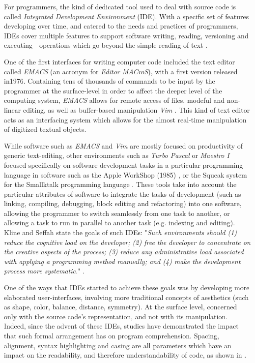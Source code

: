 For programmers, the kind of dedicated tool used to deal with source code is called \emph{Integrated Development Environment} (IDE). With a specific set of features developing over time, and catered to the needs and practices of programmers, IDEs cover multiple features to support software writing, reading, versioning and executing—operations which go beyond the simple reading of text \citep{kline_evaluation_2005}.

One of the first interfaces for writing computer code included the text editor called \emph{EMACS} (an acronym for \emph{Editor MACroS}), with a first version released in1976. Containing tens of thousands of commands to be input by the programmer at the surface-level in order to affect the deeper level of the computing system, \emph{EMACS} allows for remote access of files, modeful and non-linear editing, as well as buffer-based manipulation \emph{Vim} \citep{greenberg_multics_1996}. This kind of text editor acts as an interfacing system which allows for the almost real-time manipulation of digitized textual objects.

While software such as \emph{EMACS} and \emph{Vim} are mostly focused on productivity of generic text-editing, other environments such as \emph{Turbo Pascal} or \emph{Maestro I} focused specifically on software development tasks in a particular programming language in software such as the Apple WorkShop (1985) \citep{west_macintosh_1987}, or the Squeak system for the Smallktalk programming language \citep{ingalls_back_1997}. These tools take into account the particular attributes of software to integrate the tasks of development (such as linking, compiling, debugging, block editing and refactoring) into one software, allowing the programmer to switch seamlessly from one task to another, or allowing a task to run in parallel to another task (e.g. indexing and editing). Kline and Seffah state the goals of such IDEs: "\emph{Such environments should (1) reduce the cognitive load on the developer; (2) free the developer to concentrate on the creative aspects of the process; (3) reduce any administrative load associated with applying a programming method manually; and (4) make the development process more systematic.}" \citep{kline_evaluation_2005}.

One of the ways that IDEs started to achieve these goals was by developing more elaborated user-interfaces, involving more traditional concepts of aesthetics (such as shape, color, balance, distance, symmetry). At the surface level, concerned only with the source code's representation, and not with its manipulation. Indeed, since the advent of these IDEs, studies have demonstrated the impact that such formal arrangement has on program comprehension\citep{oman_typographic_1990,oliveira_systematic_2022}. Spacing, alignment, syntax highlighting and casing are all parameters which have an impact on the readability, and therefore understandability of code, as shown in .

